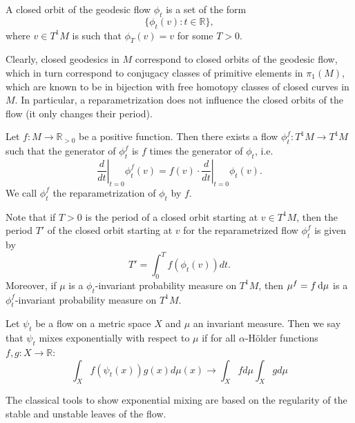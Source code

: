 \documentclass{report}
\begin{document}
\begin{definition}
    A closed orbit of the geodesic flow $\phi_t$ is a set of the form
    \[\{\phi_t(v): t \in \mathbb R\},
    \]
    where $v \in T^1 M$ is such that $\phi_T(v) = v$ for some $T > 0$.
\end{definition}
Clearly, closed geodesics in $M$ correspond to closed orbits of the geodesic flow, which in turn correspond to conjugacy classes of primitive elements in $\pi_1(M)$, which are known to be in bijection with free homotopy classes of closed curves in $M$.
In particular, a reparametrization does not influence the closed orbits of the flow (it only changes their period).

\begin{definition}
    Let $f: M \to \mathbb R_{>0}$ be a positive function.
    Then there exists a flow $\phi^f_t: T^1 M \to T^1 M$ such that the generator of $\phi^f_t$ is $f$ times the generator of $\phi_t$, i.e.\ 
    \[
    \left. \frac{d}{dt} \right|_{t=0} \phi^f_t(v) = f (v) \cdot \left. \frac{d}{dt} \right|_{t=0} \phi_t(v).
    \]
    We call $\phi^f_t$ the reparametrization of $\phi_t$ by $f$.
\end{definition}
Note that if $T > 0$ is the period of a closed orbit starting at $v \in T^1 M$, then the period $T'$ of the closed orbit starting at $v$ for the reparametrized flow $\phi^f_t$ is given by
\[
T' = \int_0^T f(\phi_t(v)) dt.
\]
Moreover, if $\mu$ is a $\phi_t$-invariant probability measure on $T^1 M$, then $\mu^f = f \,\mathrm{d} \mu$ is a $\phi^f_t$-invariant probability measure on $T^1 M$.

\begin{definition}
    Let $\psi_t$ be a flow on a metric space $X$ and $\mu$ an invariant measure.
    Then we say that $\psi_t$ mixes exponentially with respect to $\mu$ if for all $\alpha$-Hölder functions $f,g: X \to \mathbb R$:
    \[
    \int_X f(\psi_t(x)) g(x) d\mu(x) \to \int_X f d\mu \int_X g d\mu
    \]
\end{definition}
The classical tools to show exponential mixing are based on the regularity of the stable and unstable leaves of the flow.
\end{document}
